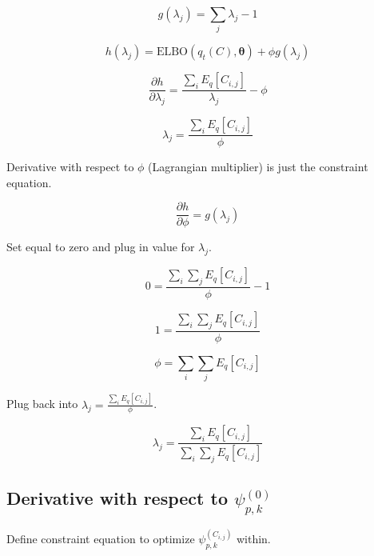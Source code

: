 \documentclass[12pt]{article}
\theoremstyle{definition}
\begin{document}
\begin{equation}
	g(\lambda_{j}) = \sum_{j} \lambda_{j} - 1
\end{equation}


\begin{equation}
	h(\lambda_{j}) = \textrm{ELBO}(q_{t}(C), \boldsymbol{\theta}) + \phi g(\lambda_{j})
\end{equation}

\begin{equation}
	\frac{\partial{h}}{\partial{\lambda_{j}}} = \frac{\sum_{i}{E}_{q}[C_{i, j}]}{\lambda_{j}} - \phi
\end{equation}

\begin{equation}
\lambda_{j} = \frac{\sum_{i}{E}_{q}[C_{i, j}]}{\phi}
\end{equation}

Derivative with respect to $\phi$ (Lagrangian multiplier) is just the constraint equation.

\begin{equation}
	\frac{\partial{h}}{\partial{\phi}} = g(\lambda_{j})
\end{equation}

Set equal to zero and plug in value for $\lambda_{j}$.

\begin{equation}
	0 = \frac{\sum_{i}\sum_{j} {E}_{q}[C_{i, j}]}{\phi} - 1
\end{equation}

\begin{equation}
1 =  \frac{\sum_{i}\sum_{j}{E}_{q}[C_{i, j}]}{\phi}
\end{equation}

\begin{equation}
\phi = \sum_{i}  \sum_{j}{E}_{q}[C_{i, j}]
\end{equation}

Plug back into $\lambda_{j} = \frac{\sum_{i}{E}_{q}[C_{i, j}]}{\phi}$.

\begin{equation}
	\lambda_{j} = \frac{\sum_{i}{E}_{q}[C_{i, j}]}{\sum_{i}  \sum_{j}{E}_{q}[C_{i, j}]}
\end{equation}

\subsection{Derivative with respect to $\psi_{p, k}^{(0)}$}

Define constraint equation to optimize $\psi_{p, k}^{(C_{i, j})}$ within.
\end{document}
